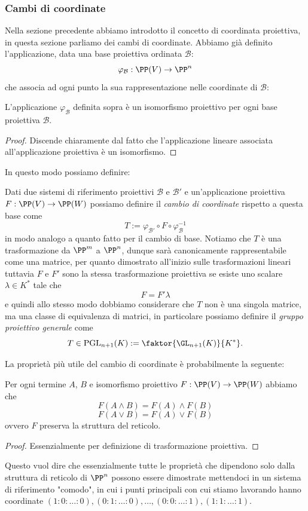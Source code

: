 \documentclass[11pt]{scrartcl}
\begin{document}
   	 \subsubsection{Cambi di coordinate}
   	 Nella sezione precedente abbiamo introdotto il concetto di coordinata proiettiva, in questa sezione parliamo dei cambi di coordinate. Abbiamo già definito l'applicazione, data una base proiettiva ordinata $\mathcal{B}$:
   	 $$\varphi_\mathcal{B}:\PP(V)\to \PP^n$$
   	 che associa ad ogni punto la sua rappresentazione nelle coordinate di $\mathcal{B}$:
   	 \begin{proposition}
   	 	L'applicazione $\varphi_\mathcal{B}$ definita sopra è un isomorfismo proiettivo per ogni base proiettiva $\mathcal{B}$.
   	 \end{proposition}
   	 \begin{proof}
   	 	Discende chiaramente dal fatto che l'applicazione lineare associata all'applicazione proiettiva è un isomorfismo.
   	 \end{proof}
   	 In questo modo possiamo definire:
   	 \begin{definition}
   	 	Dati due sistemi di riferimento proiettivi $\mathcal{B}$ e $\mathcal{B}'$ e un'applicazione proiettiva $F:\PP(V)\to\PP(W)$ possiamo definire il \textit{cambio di coordinate} rispetto a questa base come
   	 	$$T:=\varphi_\mathcal{B'}\circ F\circ \varphi_\mathcal{B}^{-1}$$
   	 	in modo analogo a quanto fatto per il cambio di base. Notiamo che $T$ è una trasformazione da $\PP^m$ a $\PP^n$, dunque sarà canonicamente rappresentabile come una matrice, per quanto dimostrato all'inizio sulle trasformazioni lineari tuttavia $F$ e $F'$ sono la stessa trasformazione proiettiva se esiste uno scalare $\lambda\in K^*$ tale che
   	 	$$F=F'\lambda$$
   	 	e quindi allo stesso modo dobbiamo considerare che $T$ non è una singola matrice, ma una classe di equivalenza di matrici, in particolare possiamo definire il \textit{gruppo proiettivo generale} come
   	 	$$T\in \text{PGL}_{n+1}(K):=\faktor{\GL_{n+1}(K)}{K^*}.$$ 
   	 \end{definition}
   	 La proprietà più utile del cambio di coordinate è probabilmente la seguente:
   	 \begin{proposition}
   	 	Per ogni termine $A$, $B$ e isomorfismo proiettivo $F:\PP(V)\to\PP(W)$ abbiamo che
   	 	$$F\left(A\land B\right)=F(A)\land F(B)$$
   	 	$$F\left(A\lor B\right)=F(A)\lor F(B)$$
   	 	ovvero $F$ preserva la struttura del reticolo.
   	 \end{proposition}
   	 \begin{proof}
   	 	Essenzialmente per definizione di trasformazione proiettiva.
   	 \end{proof}
   	 Questo vuol dire che essenzialmente tutte le proprietà che dipendono solo dalla struttura di reticolo di $\PP^n$ possono essere dimostrate mettendoci in un sistema di riferimento "comodo", in cui i punti principali con cui stiamo lavorando hanno coordinate $(1:0:\dots:0),(0:1:\dots:0),\dots,(0:0:\dots:1),(1:1:\dots:1)$.
\end{document}
